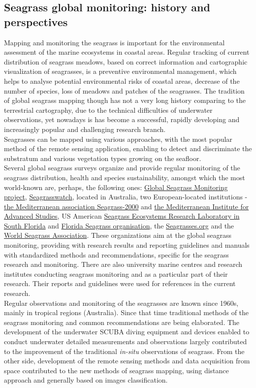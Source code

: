 \documentclass[10pt, a4paper]{article}
\begin{document}
\subsection{Seagrass global monitoring: history and perspectives}
Mapping and monitoring the seagrass is important for the environmental assessment of the marine
ecosystems in coastal areas. Regular tracking of current distribution of seagrass meadows, based on
correct information and cartographic visualization of seagrasses, is a preventive environmental
management, which helps to analyse potential environmental risks of coastal areas, decrease of the
number of species, loss of meadows and patches of the seagrasses.
The tradition of global seagrass mapping though has not a very long history comparing to the
terrestrial cartography, due to the technical difficulties of underwater observations, yet nowadays is
has become a successful, rapidly developing and increasingly popular and challenging research branch.\\
Seagrasses can be mapped using various approaches, with the most popular method of the remote
sensing application, enabling to detect and discriminate the substratum and various vegetation types
growing on the seafloor.\\
Several global seagrass surveys organize and provide regular monitoring of the seagrass distribution,
health and species sustainability, amongst which the most world-known are, perhaps, the following
ones: \href{http://www.seagrassnet.org/}{Global Seagrass Monitoring project}, \href{http://www.seagrasswatch.org/}{Seagrasswatch}, 
located in Australia, two European-located institutions - \href{http://mediterranean.seagrassonline.org/}{the Mediterranean association Seagrass-2000} and \href{http://www.imedea.uib.es/index.php}{the Mediterranean Institute for Advanced Studies}, US American 
\href{http://www2.fiu.edu/~seagrass/}{Seagrass Ecosystems Research Laboratory in South Florida} and
\href{http://www.flseagrass.org/}{Florida Seagrass organisation}, the \href{http://www.seagrasses.org/}{Seagrasses.org} and the \href{http://wsa.seagrassonline.org/}{World Seagrass Association}.
These organizations aim at the global seagrass monitoring, providing with
research results and reporting guidelines and manuals with standardized methods and
recommendations, specific for the seagrass research and monitoring. There are also university marine
centres and research institutes conducting seagrass monitoring and as a particular part of their
research. Their reports and guidelines were used for references in the current research.\\
Regular observations and monitoring of the seagrasses are known since 1960s, mainly in tropical
regions (Australia). Since that time traditional methods of the seagrass monitoring and common
recommendations are being elaborated. The development of the underwater SCUBA diving
equipment and devices enabled to conduct underwater detailed measurements and observations
largely contributed to the improvement of the traditional \textit{in-situ} observations of seagrass. From the
other side, development of the remote sensing methods and data acquisition from space contributed to
the new methods of seagrass mapping, using distance approach and generally based on images
classification.
\end{document}
